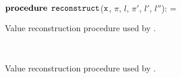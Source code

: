 \ifdefined\noauthorea
\begin{figure}[!b]
\IncMargin{2em}
\begin{algorithm}[H]
\DontPrintSemicolon
\LinesNumbered
\SetAlgoNoLine
\SetNlSkip{1em} 
\Indm\Indmm
\hrulefill\\
$\mathbf{procedure} \> \> \text{${\tt reconstruct}$}$($\text{${\tt x}$}$, $\pi$, $l$, $\pi'$, $l'$, $l''$):\;%
\vspace{1mm}
\everypar={\nl}
\Indp\Indpp
{}
\Return{$\chi$}\;
\vspace{-2mm}
\Indm\Indmm
\nonl\hrulefill\vspace{1mm}\\
\DecMargin{0.5em}
\caption{\label{alg:osr-reconstruct} Value reconstruction procedure used by \buildcomp.}
\IncMargin{0.5em}
\end{algorithm} 
\end{figure}

\else
\begin{figure}
\noindent
\begin{small}
\algmissing \\
\end{small}
\caption{Value reconstruction procedure used by \buildcomp.}
\label{alg:osr-reconstruct}
\end{figure}
\fi

